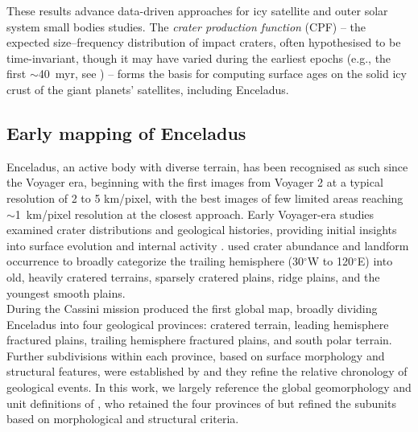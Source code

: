 \documentclass[preprint,11pt,3p,times,authoryear]{elsarticle}
\begin{document}
These results advance data-driven approaches for icy satellite and outer solar system small bodies studies. The \textit{crater production function} (CPF) -- the expected size–frequency distribution of impact craters, often hypothesised to be time-invariant, though it may have varied during the earliest epochs (e.g., the first $\sim$40~myr, see \citet{Bottke2023,Bottke2024})
-- forms the basis for computing surface ages on the solid icy crust of the giant planets' satellites, including Enceladus.

\subsection{Early mapping of Enceladus}
Enceladus, an active body with diverse terrain, has been recognised as such since the Voyager era, beginning with the first images from Voyager 2 at a typical resolution of 2 to 5 km/pixel, with the best images of few limited areas reaching $\sim$1~km/pixel resolution at the closest approach. Early Voyager-era studies examined crater distributions and geological histories, providing initial insights into surface evolution and internal activity \citep{Smith1982, Plescia1983, Schenk1989, Pozio1990, Kargel1996}. \citet{Smith1982} used crater abundance and landform occurrence to broadly categorize the trailing hemisphere (30$^\circ$W to 120$^\circ$E) into old, heavily cratered terrains, sparsely cratered plains, ridge plains, and the youngest smooth plains. \\

During the Cassini mission \citet{Spencer2009} produced the first global map, broadly dividing Enceladus into four geological provinces: cratered terrain, leading hemisphere fractured plains, trailing hemisphere fractured plains, and south polar terrain. Further subdivisions within each province, based on surface morphology and structural features, were established by \citet{Helfenstein2010} and they refine the relative chronology of geological events. In this work, we largely reference the global geomorphology and unit definitions of \citet{CrowWillard2015}, who retained the four provinces of \citet{Spencer2009} but refined the subunits based on morphological and structural criteria.\\
\end{document}
